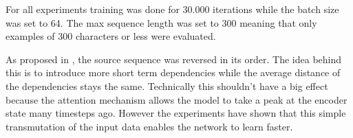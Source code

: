  For all experiments training was done for 30.000 iterations while the batch size was set to 64. The max sequence length was set to 300 meaning that only examples of 300 characters or less were evaluated.

  As proposed in \cite{seq2seq}, the source sequence was reversed in its order. The idea behind this is to introduce more short term dependencies while the average distance of the dependencies stays the same. Technically this shouldn't have a big effect because the attention mechanism allows the model to take a peak at the encoder state many timesteps ago. However the experiments have shown that this simple transmutation of the input data enables the network to learn faster.
